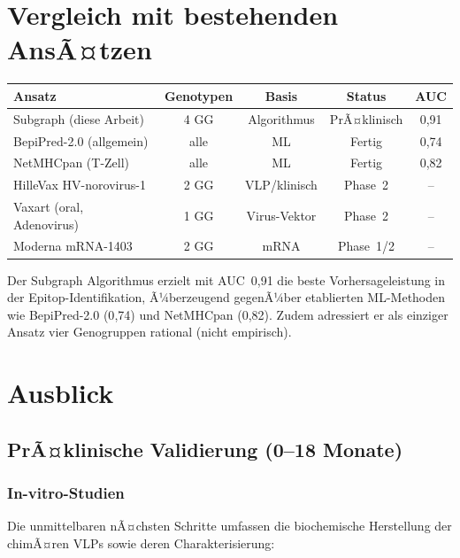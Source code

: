 ﻿\documentclass[a4paper,12pt]{article}
\theoremstyle{plain}
\theoremstyle{definition}
\theoremstyle{remark}
\begin{document}
\section{Vergleich mit bestehenden AnsÃ¤tzen}

\begin{center}
\begin{tabular}{lcccc}
\toprule
\textbf{Ansatz} & \textbf{Genotypen} & \textbf{Basis} & \textbf{Status} & \textbf{AUC} \\
\midrule
Subgraph (diese Arbeit) & 4 GG & Algorithmus & PrÃ¤klinisch & 0{,}91 \\
BepiPred-2.0 (allgemein) & alle & ML & Fertig & 0{,}74 \\
NetMHCpan (T-Zell) & alle & ML & Fertig & 0{,}82 \\
HilleVax HV-norovirus-1 & 2 GG & VLP/klinisch & Phase~2 & -- \\
Vaxart (oral, Adenovirus) & 1 GG & Virus-Vektor & Phase~2 & -- \\
Moderna mRNA-1403 & 2 GG & mRNA & Phase~1/2 & -- \\
\bottomrule
\end{tabular}
\end{center}

Der Subgraph Algorithmus erzielt mit AUC~0{,}91 die beste Vorhersageleistung in
der Epitop-Identifikation, Ã¼berzeugend gegenÃ¼ber etablierten ML-Methoden wie
BepiPred-2.0 (0{,}74) und NetMHCpan (0{,}82). Zudem adressiert er als einziger Ansatz
vier Genogruppen rational (nicht empirisch).

\section{Ausblick}

\subsection{PrÃ¤klinische Validierung (0--18 Monate)}

\subsubsection{In-vitro-Studien}

Die unmittelbaren nÃ¤chsten Schritte umfassen die biochemische Herstellung der chimÃ¤ren
VLPs sowie deren Charakterisierung:
\end{document}
